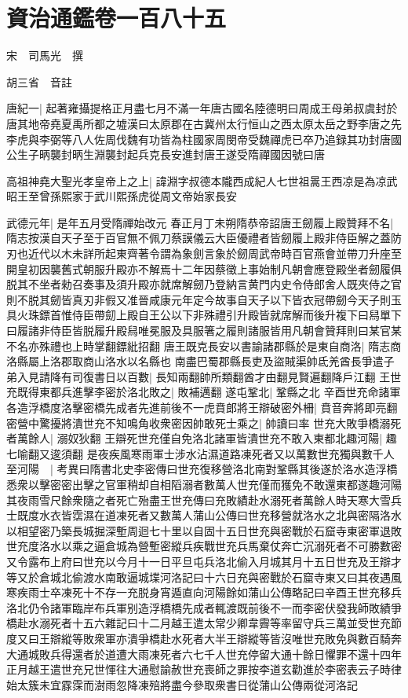 \chapter{資治通鑑卷一百八十五}


宋　司馬光　撰

胡三省　音註

唐紀一|{
	起著雍攝提格正月盡七月不滿一年唐古國名陸德明曰周成王母弟叔虞封於唐其地帝堯夏禹所都之墟漢曰太原郡在古冀州太行恒山之西太原太岳之野李唐之先李虎與李弼等八人佐周伐魏有功皆為柱國家周閔帝受魏禪虎已卒乃追録其功封唐國公生子昞襲封昞生淵襲封起兵克長安進封唐王遂受隋禪國因號曰唐}


高祖神堯大聖光孝皇帝上之上|{
	諱淵字叔德本隴西成紀人七世祖暠王西凉是為凉武昭王至曾孫熙家于武川熙孫虎從周文帝始家長安}


武德元年|{
	是年五月受隋禪始改元}
春正月丁未朔隋恭帝詔唐王劒履上殿贊拜不名|{
	隋志按漢自天子至于百官無不佩刀蔡謨儀云大臣優禮者皆劒履上殿非侍臣解之蓋防刃也近代以木未詳所起東齊著令謂為象劍言象於劒周武帝時百官燕會並帶刀升座至開皇初因襲舊式朝服升殿亦不解焉十二年因蔡徵上事始制凡朝會應登殿坐者劒履俱脱其不坐者勑召奏事及須升殿亦就席解劒乃登納言黄門内史令侍郎舍人既夾侍之官則不脱其劒皆真刃非假又准晉咸康元年定今故事自天子以下皆衣冠帶劒今天子則玉具火珠鏢首惟侍臣帶劎上殿自王公以下非殊禮引升殿皆就席解而後升複下曰舄單下曰履諸非侍臣皆脱履升殿舄唯冕服及具服箸之履則諸服皆用凡朝會贊拜則曰某官某不名亦殊禮也上時掌翻鏢紕招翻}
唐王既克長安以書諭諸郡縣於是東自商洛|{
	隋志商洛縣屬上洛郡取商山洛水以名縣也}
南盡巴蜀郡縣長吏及盜賊渠帥氐羌酋長爭遣子弟入見請降有司復書日以百數|{
	長知兩翻帥所類翻酋才由翻見賢遍翻降戶江翻}
王世充既得東都兵進擊李密於洛北敗之|{
	敗補邁翻}
遂屯鞏北|{
	鞏縣之北}
辛酉世充命諸軍各造浮橋度洛擊密橋先成者先進前後不一虎賁郎將王辯破密外柵|{
	賁音奔將即亮翻}
密營中驚擾將潰世充不知鳴角收衆密因帥敢死士乘之|{
	帥讀曰率}
世充大敗爭橋溺死者萬餘人|{
	溺奴狄翻}
王辯死世充僅自免洛北諸軍皆潰世充不敢入東都北趣河陽|{
	趣七喻翻又逡須翻}
是夜疾風寒雨軍士涉水沾濕道路凍死者又以萬數世充獨與數千人至河陽　|{
	考異曰隋書北史李密傳曰世充復移營洛北南對鞏縣其後遂於洛水造浮橋悉衆以擊密密出擊之官軍稍却自相䧟溺者數萬人世充僅而獲免不敢還東都遂趣河陽其夜雨雪尺餘衆隨之者死亡殆盡王世充傳曰充敗績赴水溺死者萬餘人時天寒大雪兵士既度水衣皆霑濕在道凍死者又數萬人蒲山公傳曰世充移營就洛水之北與密隔洛水以相望密乃築長城掘深塹周迴七十里以自固十五日世充與密戰於石窟寺東密軍退敗世充度洛水以乘之逼倉城為營塹密縱兵疾戰世充兵馬棄仗奔亡沉溺死者不可勝數密又令露布上府曰世充以今月十一日平旦屯兵洛北偷入月城其月十五日世充及王辯才等又於倉城北偷渡水南敢逼城堞河洛記曰十六日充與密戰於石窟寺東又曰其夜遇風寒疾雨士卒凍死十不存一充脱身宵遁直向河陽餘如蒲山公傳略記曰辛酉王世充移兵洛北仍令諸軍臨岸布兵軍别造浮橋橋先成者輒渡既前後不一而李密伏發我師敗績爭橋赴水溺死者十五六雜記曰十二月越王遣太常少卿韋霽等率留守兵三萬並受世充節度又曰王辯縱等敗衆軍亦潰爭橋赴水死者大半王辯縱等皆沒唯世充敗免與數百騎奔大通城敗兵得還者於道遭大雨凍死者六七千人世充停留大通十餘日懼罪不還十四年正月越王遣世充兄世惲往大通慰諭赦世充喪師之罪按李道玄勸進於李密表云子時律始太簇未宜霡霂而澍雨忽降凍殕將盡今參取衆書日從蒲山公傳兩從河洛記}
